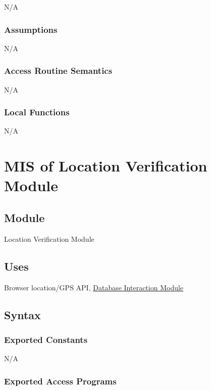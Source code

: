 \documentclass[12pt, titlepage]{article}
\begin{document}
{  N/A

  \subsubsection{Assumptions}

  N/A

  \subsubsection{Access Routine Semantics}

  N/A

  \subsubsection{Local Functions}

  N/A

  \section{MIS of Location Verification Module}
  \label{sec:LV}
  \subsection{Module}

  Location Verification Module

  \subsection{Uses}

  Browser location/GPS API, \hyperref[sec:DI]{Database Interaction Module}

  \subsection{Syntax}

  \subsubsection{Exported Constants}

  N/A

  \subsubsection{Exported Access Programs}

}
\end{document}
